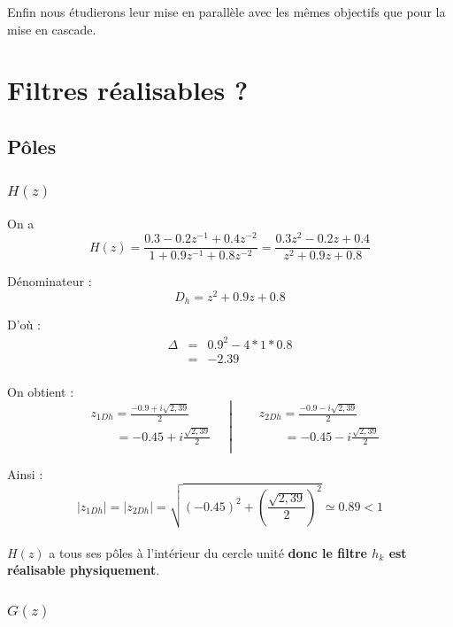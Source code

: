 \documentclass[12,french]{report}
\begin{document}
Enfin nous étudierons leur mise en parallèle avec les mêmes objectifs que pour la mise en cascade.


\chapter{Filtres réalisables ?}

\section{Pôles}

\subsection{$H(z)$}

\vspace{0.25cm}

On a $$ H(z) = \frac{0.3-0.2z^{-1}+0.4z^{-2}}{1+0.9z^{-1}+0.8z^{-2}} = \frac{0.3z^2-0.2z+0.4}{z^2+0.9z+0.8} $$

Dénominateur : 
$$ D_h= z^2+0.9z+0.8 $$

D'où : $$ \begin{array}{ccl}
\Delta & = & 0.9^2-4*1*0.8 \\
	   & = & -2.39 \\
\end{array} $$

On obtient :
$$\left.\begin{aligned}
	&z_{1Dh} = \frac{-0.9+i\sqrt{2,39}}{2} \\
	&\quad\quad = -0.45 + i\frac{\sqrt{2,39}}{2} \\
\end{aligned}\quad\right|
\quad\left.\begin{aligned}
	&z_{2Dh} = \frac{-0.9-i\sqrt{2,39}}{2}\\
	&\quad\quad = -0.45 - i\frac{\sqrt{2,39}}{2} \\
\end{aligned}\right.$$

Ainsi :
$$ |z_{1Dh}|=|z_{2Dh}|=\sqrt{(-0.45)^2+\left(\frac{\sqrt{2,39}}{2}\right)^2} \simeq 0.89 < 1 $$\\

$H(z)$ a tous ses pôles à l'intérieur du cercle unité \textbf{donc le filtre $h_k$ est réalisable physiquement}.\\

\subsection{$G(z)$}
\end{document}

